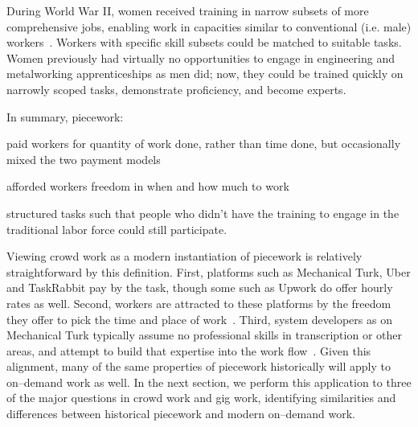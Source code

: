 \documentclass[trackingWork]{subfiles}
\begin{document}
During World War II, women received training in narrow subsets of more comprehensive jobs, enabling work in capacities similar to conventional (i.e. male) workers~\cite{hart2013rise}.
Workers with specific skill subsets could be matched to suitable tasks.
Women previously had virtually no opportunities
to engage in engineering and metalworking apprenticeships as men did;
now, they
could be trained quickly on narrowly scoped tasks,
demonstrate proficiency, and become experts.

In summary, piecework:
\begin{inlinelist}
  \item paid workers for quantity of work done, rather than time done,
        but occasionally mixed the two payment models
  \item afforded workers freedom in when and how much to work
  \item structured tasks such that people who didn't have the training
        to engage in the traditional labor force could still participate.
\end{inlinelist}

Viewing crowd work as a modern instantiation of piecework is relatively straightforward by this definition.
First, platforms such as Mechanical Turk, Uber and TaskRabbit pay by the task, though some such as Upwork do offer hourly rates as well.
Second, workers are attracted to these platforms by the freedom they offer to pick the time and place of work~\cite{martin2014being,whyWouldAnyoneBrewer}.
Third, system developers as on Mechanical Turk typically assume no professional skills in transcription or other areas, and attempt to build that expertise into the work flow~\cite{noronha2011platemate,bernsteinSoylent}.
Given this alignment, many of the same properties of piecework historically will apply to on--demand work as well. 
In the next section, we perform this application to three of the major questions in crowd work and gig work, identifying similarities and differences between historical piecework and modern on--demand work.



\end{document}
